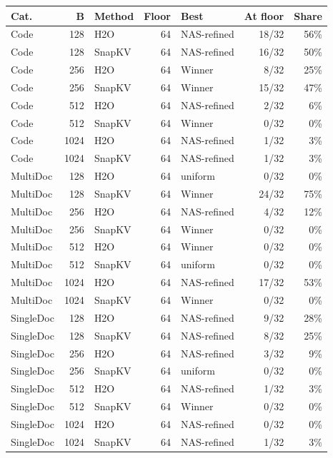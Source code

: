 \begin{table}[t]
  \centering
  \scriptsize
  \setlength{\tabcolsep}{3pt}
  \begin{tabular}{@{}l r l r l r r@{}}
    \toprule
    Cat. & B & Method & Floor & Best & At floor & Share \\
    \midrule
    Code & 128 & H2O & 64 & NAS-refined & 18/32 & 56\% \\
    Code & 128 & SnapKV & 64 & NAS-refined & 16/32 & 50\% \\
    Code & 256 & H2O & 64 & Winner & 8/32 & 25\% \\
    Code & 256 & SnapKV & 64 & Winner & 15/32 & 47\% \\
    Code & 512 & H2O & 64 & NAS-refined & 2/32 & 6\% \\
    Code & 512 & SnapKV & 64 & Winner & 0/32 & 0\% \\
    Code & 1024 & H2O & 64 & NAS-refined & 1/32 & 3\% \\
    Code & 1024 & SnapKV & 64 & NAS-refined & 1/32 & 3\% \\
    MultiDoc & 128 & H2O & 64 & uniform & 0/32 & 0\% \\
    MultiDoc & 128 & SnapKV & 64 & Winner & 24/32 & 75\% \\
    MultiDoc & 256 & H2O & 64 & NAS-refined & 4/32 & 12\% \\
    MultiDoc & 256 & SnapKV & 64 & Winner & 0/32 & 0\% \\
    MultiDoc & 512 & H2O & 64 & Winner & 0/32 & 0\% \\
    MultiDoc & 512 & SnapKV & 64 & uniform & 0/32 & 0\% \\
    MultiDoc & 1024 & H2O & 64 & NAS-refined & 17/32 & 53\% \\
    MultiDoc & 1024 & SnapKV & 64 & Winner & 0/32 & 0\% \\
    SingleDoc & 128 & H2O & 64 & NAS-refined & 9/32 & 28\% \\
    SingleDoc & 128 & SnapKV & 64 & NAS-refined & 8/32 & 25\% \\
    SingleDoc & 256 & H2O & 64 & NAS-refined & 3/32 & 9\% \\
    SingleDoc & 256 & SnapKV & 64 & uniform & 0/32 & 0\% \\
    SingleDoc & 512 & H2O & 64 & NAS-refined & 1/32 & 3\% \\
    SingleDoc & 512 & SnapKV & 64 & Winner & 0/32 & 0\% \\
    SingleDoc & 1024 & H2O & 64 & NAS-refined & 0/32 & 0\% \\
    SingleDoc & 1024 & SnapKV & 64 & NAS-refined & 1/32 & 3\% \\

\end{tabular}
\end{table}
